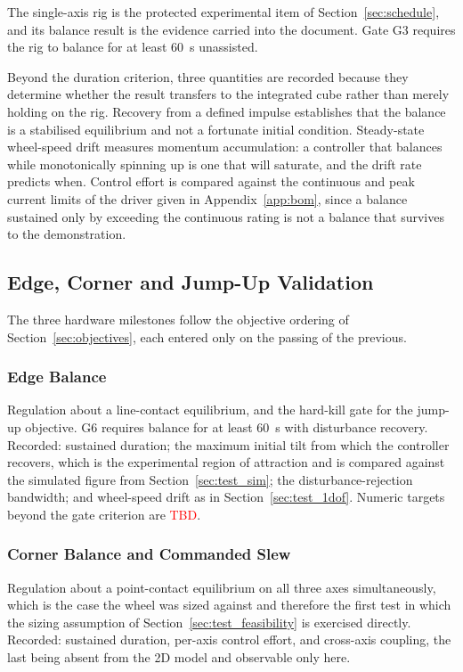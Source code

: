 The single-axis rig is the protected experimental item of
Section~\ref{sec:schedule}, and its balance result is the evidence carried into
the document. Gate G3 requires the rig to balance for at least 60~s unassisted.

Beyond the duration criterion, three quantities are recorded because they
determine whether the result transfers to the integrated cube rather than merely
holding on the rig. Recovery from a defined impulse establishes that the balance
is a stabilised equilibrium and not a fortunate initial condition. Steady-state
wheel-speed drift measures momentum accumulation: a controller that balances
while monotonically spinning up is one that will saturate, and the drift rate
predicts when. Control effort is compared against the continuous and peak current
limits of the driver given in Appendix~\ref{app:bom}, since a balance sustained
only by exceeding the continuous rating is not a balance that survives to the
demonstration.

\subsection{Edge, Corner and Jump-Up Validation}
\label{sec:test_milestones}

The three hardware milestones follow the objective ordering of
Section~\ref{sec:objectives}, each entered only on the passing of the previous.

\subsubsection{Edge Balance}
\label{sec:test_edge}

Regulation about a line-contact equilibrium, and the hard-kill gate for the
jump-up objective. G6 requires balance for at least 60~s with disturbance
recovery. Recorded: sustained duration; the maximum initial tilt from which the
controller recovers, which is the experimental region of attraction and is
compared against the simulated figure from Section~\ref{sec:test_sim}; the
disturbance-rejection bandwidth; and wheel-speed drift as in
Section~\ref{sec:test_1dof}. Numeric targets beyond the gate criterion are
\textcolor{red}{TBD}.

\subsubsection{Corner Balance and Commanded Slew}
\label{sec:test_corner}

Regulation about a point-contact equilibrium on all three axes simultaneously,
which is the case the wheel was sized against and therefore the first test in
which the sizing assumption of Section~\ref{sec:test_feasibility} is exercised
directly. Recorded: sustained duration, per-axis control effort, and cross-axis
coupling, the last being absent from the 2D model and observable only here.

